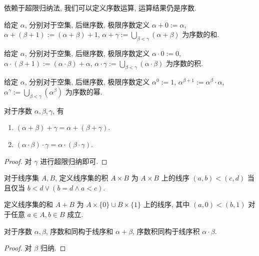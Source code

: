 依赖于超限归纳法, 我们可以定义序数运算, 运算结果仍是序数.

\begin{definition}
    给定 \(\alpha\), 分别对于空集, 后继序数, 极限序数定义 \(\alpha + 0 := \alpha\), \(\alpha + (\beta + 1) := (\alpha + \beta) + 1\), \(\alpha + \gamma := \bigcup_{\beta < \gamma} (\alpha + \beta)\) 为序数的和.
\end{definition}

\begin{definition}
    给定 \(\alpha\), 分别对于空集, 后继序数, 极限序数定义 \(\alpha \cdot 0 := 0\), \(\alpha \cdot (\beta + 1) := (\alpha \cdot \beta) + \alpha\), \(\alpha \cdot \gamma := \bigcup_{\beta < \gamma} (\alpha \cdot \beta)\) 为序数的积.
\end{definition}

\begin{definition}
    给定 \(\alpha\), 分别对于空集, 后继序数, 极限序数定义 \(\alpha^0 := 1\), \(\alpha^{\beta + 1} := \alpha^\beta \cdot \alpha\), \(\alpha^\gamma := \bigcup_{\beta < \gamma} (\alpha^\beta)\) 为序数的幂.
\end{definition}

\begin{lemma}
    对于序数 \(\alpha, \beta, \gamma\), 有
    \begin{enumerate}
        \item \((\alpha + \beta) + \gamma = \alpha + (\beta + \gamma)\).
        \item \((\alpha \cdot \beta) \cdot \gamma = \alpha \cdot (\beta \cdot \gamma)\).
    \end{enumerate}

    \begin{proof}
        对 \(\gamma\) 进行超限归纳即可.
    \end{proof}
\end{lemma}

\begin{definition}
    对于线序集 \(A, B\), 定义线序集的积 \(A \times B\) 为 \(A \times B\) 上的线序 \((a,b) < (c,d)\) 当且仅当 \(b < d \vee (b = d \wedge a < c)\).

    定义线序集的和 \(A + B\) 为 \(A \times \{0\} \cup B \times \{1\}\) 上的线序, 其中 \((a,0) < (b,1)\) 对于任意 \(a \in A, b \in B\) 成立.
\end{definition}

\begin{definition}
    对于序数 \(\alpha, \beta\), 序数和同构于线序和 \(\alpha + \beta\), 序数积同构于线序积 \(\alpha \cdot \beta\).

    \begin{proof}
        对 \(\beta\) 归纳.
    \end{proof}
\end{definition}

